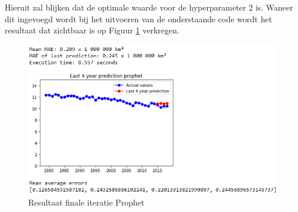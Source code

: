 Hieruit zal blijken dat de optimale waarde voor de hyperparameter 2 is. Waneer dit ingevoegd wordt bij het uitvoeren van de onderstaande code wordt het resultaat dat zichtbaar is op Figuur \ref{fig:uvnsprophet} verkregen.

\begin{figure}[!h]
    \centering
    \caption{Resultaat finale iteratie Prophet}
    \label{fig:uvnsprophet}
    \includegraphics[width=1\linewidth]{uv_ns_prophet}
\end{figure}

\clearpage


